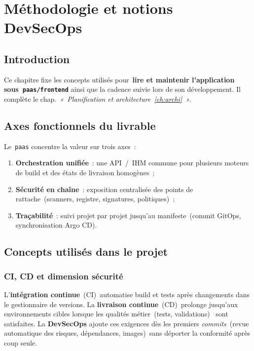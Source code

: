 
\chapter{Méthodologie et notions DevSecOps}
\label{ch:methodo}

\section{Introduction}

Ce chapitre fixe les concepts utilisés pour~\textbf{lire et maintenir l'application sous~\texttt{paas/frontend}} ainsi que la cadence suivie lors de son développement. Il complète le chap.~\emph{«~Planification et architecture~\ref{ch:archi}~»}.

\section*{Axes fonctionnels du livrable}

Le~\texttt{paas} concentre la valeur sur trois axes~:

\begin{enumerate}[leftmargin=*]
\item \textbf{Orchestration unifiée}~: une API~/~IHM commune pour plusieurs moteurs de build et des états de livraison homogènes~;
\item \textbf{Sécurité en chaîne}~: exposition centralisée des points de rattache~(scanners, registre, signatures, politiques)~;
\item \textbf{Traçabilité}~: suivi projet par projet jusqu'au manifeste~(commit GitOps, synchronisation Argo CD).
\end{enumerate}

\section{Concepts utilisés dans le projet}

\subsection{CI, CD et dimension sécurité}

L'\textbf{intégration continue}~(CI)~automatise build et tests après changements dans le gestionnaire de versions. La \textbf{livraison continue}~(CD)~prolonge jusqu'aux environnements cibles lorsque les qualités métier~(tests, validations)~ sont satisfaites. La \textbf{DevSecOps} ajoute ces exigences dès les premiers \emph{commits}~(revue automatique des risques, dépendances, images)~sans déporter la conformité après coup seule.

